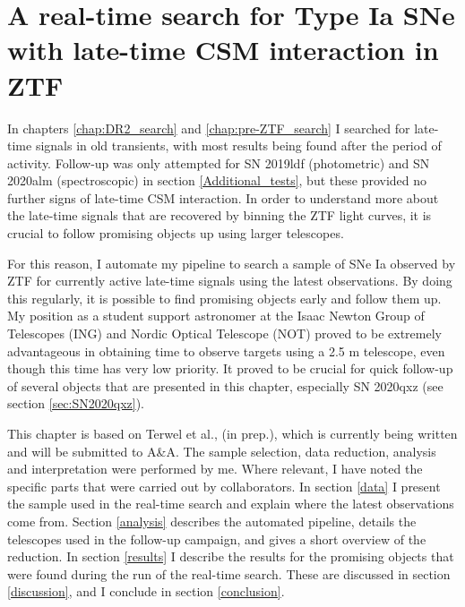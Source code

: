 \documentclass[a4paper,oneside,12pt, class=Latex/Classes/PhDthesisPSnPDF, crop=false]{standalone}
\begin{document}
\doublespacing
\chapter{A real-time search for Type Ia SNe with late-time CSM interaction in ZTF}
\label{chap:Real-time}
In chapters \ref{chap:DR2_search} and \ref{chap:pre-ZTF_search} I searched for late-time signals in old transients, with most results being found after the period of activity. Follow-up was only attempted for SN 2019ldf (photometric) and SN 2020alm (spectroscopic) in section \ref{Additional_tests}, but these provided no further signs of late-time CSM interaction. In order to understand more about the late-time signals that are recovered by binning the ZTF light curves, it is crucial to follow promising objects up using larger telescopes.

For this reason, I automate my pipeline to search a sample of SNe Ia observed by ZTF for currently active late-time signals using the latest observations. By doing this regularly, it is possible to find promising objects early and follow them up. My position as a student support astronomer at the Isaac Newton Group of Telescopes (ING) and Nordic Optical Telescope (NOT) proved to be extremely advantageous in obtaining time to observe targets using a 2.5 m telescope, even though this time has very low priority. It proved to be crucial for quick follow-up of several objects that are presented in this chapter, especially SN 2020qxz (see section \ref{sec:SN2020qxz}).

This chapter is based on Terwel et al., (in prep.), which is currently being written and will be submitted to A\&A. The sample selection, data reduction, analysis and interpretation were performed by me. Where relevant, I have noted the specific parts that were carried out by collaborators. In section \ref{data} I present the sample used in the real-time search and explain where the latest observations come from. Section \ref{analysis} describes the automated pipeline, details the telescopes used in the follow-up campaign, and gives a short overview of the reduction. In section \ref{results} I describe the results for the promising objects that were found during the run of the real-time search. These are discussed in section \ref{discussion}, and I conclude in section \ref{conclusion}.
\end{document}
